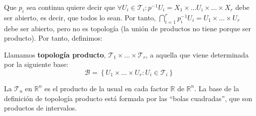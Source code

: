 Que $p_i$ sea continua quiere decir que $\forall U_i \in \mathcal{T}_i : p^{-1}U_i = X_1 \times \ldots U_i \times \ldots \times X_r$ debe ser abierto, es decir, que todos lo sean. Por tanto, $\bigcap_{i=1}^{r} p_i^{-1}U_i = U_1 \times \ldots \times U_r$ debe ser abierto, pero no es topología (la unión de productos no tiene porque ser producto). Por tanto, definimos:
\begin{defi}
Llamamos \textbf{topología producto}, $\mathcal{T}_1 \times \ldots \times \mathcal{T}_r$, a aquella que viene determinada por la siguiente base:
\[
\mathcal{B} = \left\{ U_1 \times \ldots \times U_r: U_i \in \mathcal{T}_i \right\}
\]
\end{defi}

\begin{ej}
La $\mathcal{T}_u$ en $\mathbb{R}^n$ es el producto de la usual en cada factor $\mathbb{R}$ de $\mathbb{R}^n$. La base de la definición de topología producto está formada por las ``bolas cuadradas'', que son productos de intervalos.
\end{ej}

